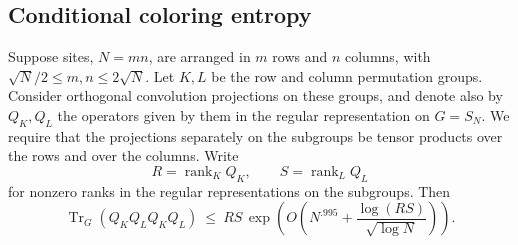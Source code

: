\subsection{Conditional coloring entropy}
\begin{proposition}\label{tra:regular-ranks:crossing}
\label{tra:regular-ranks:crossing-statement}
Suppose sites, \(N=mn\), are arranged in \(m\) rows and \(n\) columns, with
\(\sqrt{N}/2\le m,n\le2\sqrt N\).
Let \(K,L\) be the row and column permutation groups. Consider orthogonal convolution projections on these groups, and denote also by \(Q_K,Q_L\) the operators given by them in the regular representation on \(G=S_N\). We require that the projections separately on the subgroups be tensor products over the rows and over the columns. Write
\[
                    R=\operatorname{rank}_{K} Q_K,\qquad
                    S=\operatorname{rank}_{L} Q_L
\]
for nonzero ranks in the regular representations on the subgroups. Then
\begin{equation}
 \operatorname{Tr}_{G}(Q_K Q_L Q_K Q_L)
       \ \le\ R S\,\exp\!\left(O\!\left(N^{.995}
                          +\frac{\log(RS)}{\sqrt{\log N}}\right)\right).\label{tra:regular-ranks:eq4}
\end{equation}
\end{proposition}
